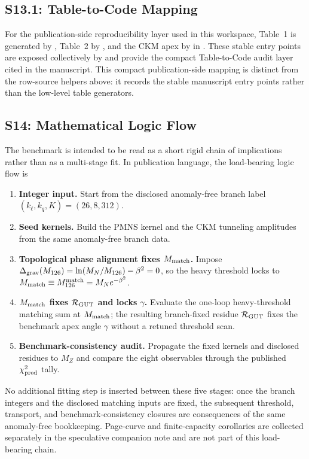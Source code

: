 \documentclass[11pt]{article}
\begin{document}
\subsection*{S13.1: Table-to-Code Mapping}

For the publication-side reproducibility layer used in this workspace, Table~1 is generated by , Table~2 by , and the CKM apex by  in . These stable entry points are exposed collectively by  and provide the compact Table-to-Code audit layer cited in the manuscript. This compact publication-side mapping is distinct from the row-source helpers above: it records the stable manuscript entry points rather than the low-level table generators.

\subsection*{S14: Mathematical Logic Flow}
\label{supp-sec:s14-mathematical-logic-flow}

The benchmark is intended to be read as a short rigid chain of implications
rather than as a multi-stage fit. In publication language, the load-bearing
logic flow is
\begin{enumerate}
\item \textbf{Integer input.} Start from the disclosed anomaly-free branch label $(k_{\ell},k_q,K)=(26,8,312)$.
\item \textbf{Seed kernels.} Build the PMNS kernel and the CKM tunneling amplitudes from the same anomaly-free branch data.
\item \textbf{Topological phase alignment fixes $M_{\rm match}$.} Impose $\Delta_{\rm grav}(M_{126})=\ln(M_N/M_{126})-\beta^2=0$, so the heavy threshold locks to $M_{\rm match}\equiv M_{126}^{\rm match}=M_N e^{-\beta^2}$.
\item \textbf{$M_{\rm match}$ fixes $\mathcal R_{\rm GUT}$ and locks $\gamma$.} Evaluate the one-loop heavy-threshold matching sum at $M_{\rm match}$; the resulting branch-fixed residue $\mathcal R_{\rm GUT}$ fixes the benchmark apex angle $\gamma$ without a retuned threshold scan.
\item \textbf{Benchmark-consistency audit.} Propagate the fixed kernels and disclosed residues to $M_Z$ and compare the eight observables through the published $\chi^2_{\rm pred}$ tally.
\end{enumerate}
No additional fitting step is inserted between these five stages: once the
branch integers and the disclosed matching inputs are fixed, the subsequent
threshold, transport, and benchmark-consistency closures are consequences of
the same anomaly-free bookkeeping. Page-curve and finite-capacity corollaries
are collected separately in the speculative companion note and are not part of
this load-bearing chain.
\end{document}
